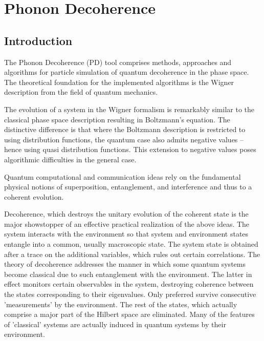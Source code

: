 

\chapter{Phonon Decoherence}   \label{wigner}


\section{Introduction}
The Phonon Decoherence (PD) tool comprises methods, approaches and algorithms for particle simulation of quantum decoherence in the phase space. The theoretical foundation for the implemented algorithms is the Wigner description from the field of quantum mechanics.

The evolution of a system in the Wigner formalism is remarkably similar to the classical phase space description resulting in Boltzmann's equation. The distinctive difference is that where the Boltzmann description is restricted to using distribution functions, the quantum case also admits negative values -- hence using quasi distribution functions. This extension to negative values poses algorithmic difficulties in the general case.

Quantum computational and communication ideas rely on the fundamental
physical notions of superposition, entanglement, and interference and thus to a coherent evolution.

Decoherence, which destroys the unitary evolution of the coherent state is
the major showstopper of an effective practical realization of the above ideas. The
system interacts with the environment so that system and environment states
entangle into a common, usually macroscopic state. The system state is
obtained after a trace on the additional variables, which rules out certain correlations.
The theory of decoherence addresses the manner in which some quantum
systems become classical due to such entanglement with the environment. The
latter in effect monitors certain observables in the system, destroying coherence
between the states corresponding to their eigenvalues. Only preferred survive
consecutive 'measurements' by the environment. The
rest of the states, which actually comprise a major part of the Hilbert space are
eliminated. Many of the features of 'classical' systems are actually induced in quantum
systems by their environment.

